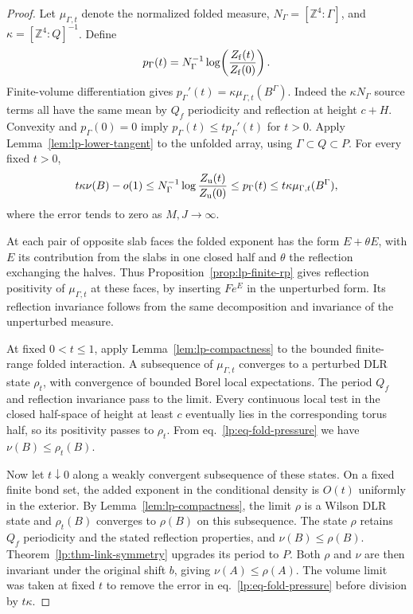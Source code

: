 \documentclass[11pt,letterpaper,reqno]{amsart}
\numberwithin{equation}{section}
\renewcommand{\eqref}[1]{\textup{eq.~\ref{#1}}}
\theoremstyle{definition}
\theoremstyle{remark}
\begin{document}
\begin{proof}
Let \(\mu_{\Gamma,t}\) denote the normalized folded measure,
\(N_\Gamma=[\mathbb Z^4:\Gamma]\), and
\(\kappa=[\mathbb Z^4:Q]^{-1}\). Define
\[
 p_\Gamma(t)=N_\Gamma^{-1}
                \log\!\left(\frac{Z_{\rm f}(t)}{Z_{\rm f}(0)}\right).
\]
Finite-volume differentiation gives
\(p_\Gamma'(t)=\kappa\mu_{\Gamma,t}(B^\Gamma)\). Indeed the
\(\kappa N_\Gamma\) source terms all have the same mean by
\(Q_f\) periodicity and reflection at height \(c+H\).
Convexity and \(p_\Gamma(0)=0\) imply
\(p_\Gamma(t)\le t p_\Gamma'(t)\) for \(t>0\).
Apply Lemma~\ref{lem:lp-lower-tangent} to the unfolded array,
using \(\Gamma\subset Q\subset P\). For every fixed \(t>0\),
\begin{equation}\label{lp:eq-fold-pressure}
 t\kappa\nu(B)-o(1)
 \le N_\Gamma^{-1}\log\frac{Z_{\rm u}(t)}{Z_{\rm u}(0)}
 \le p_\Gamma(t)
 \le t\kappa\mu_{\Gamma,t}(B^\Gamma),
\end{equation}
where the error tends to zero as \(M,J\to\infty\).

At each pair of opposite slab faces the folded exponent has the
form \(E+\theta E\), with \(E\) its contribution from the slabs in
one closed half and \(\theta\) the reflection exchanging the halves.
Thus Proposition~\ref{prop:lp-finite-rp} gives reflection positivity
of \(\mu_{\Gamma,t}\) at these faces, by inserting \(Fe^{E}\) in
the unperturbed form. Its reflection invariance follows from the
same decomposition and invariance of the unperturbed measure.

At fixed \(0<t\le1\), apply Lemma~\ref{lem:lp-compactness} to
the bounded finite-range folded interaction. A subsequence of
\(\mu_{\Gamma,t}\) converges to a perturbed DLR state \(\rho_t\),
with convergence of bounded Borel local expectations.
The period \(Q_f\) and reflection invariance pass to the limit.
Every continuous local test in the closed half-space of height
at least \(c\) eventually lies in the corresponding torus half,
so its positivity passes to \(\rho_t\). From
\eqref{lp:eq-fold-pressure} we have \(\nu(B)\le\rho_t(B)\).

Now let \(t\downarrow0\) along a weakly convergent subsequence
of these states. On a fixed finite bond set, the added exponent
in the conditional density is \(O(t)\) uniformly in the exterior.
By Lemma~\ref{lem:lp-compactness}, the limit \(\rho\) is a Wilson
DLR state and \(\rho_t(B)\) converges to \(\rho(B)\) on this
subsequence. The state \(\rho\) retains \(Q_f\) periodicity and
the stated reflection properties, and \(\nu(B)\le\rho(B)\).
Theorem~\ref{lp:thm-link-symmetry} upgrades its period to \(P\).
Both \(\rho\) and \(\nu\) are then invariant under the original
shift \(b\), giving \(\nu(A)\le\rho(A)\). The volume limit was
taken at fixed \(t\) to remove the error in
\eqref{lp:eq-fold-pressure} before division by \(t\kappa\).
\end{proof}
\end{document}
